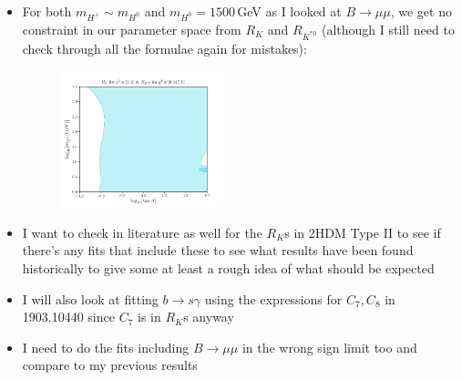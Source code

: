 \documentclass[11pt]{article}
\begin{document}
\begin{itemize}
    \item For both $m_{H^+}\sim m_{H^0}$ and $m_{H^0}=1500\,$GeV as I looked at $B\to\mu\mu$, we get no constraint in our parameter space from $R_K$ and $R_{K^{*0}}$ (although I still need to check through all the formulae again for mistakes):
        \begin{figure}[H]
            \centering
            \includegraphics[width=0.45\textwidth]{rks_plot.png}
        \end{figure}
    \item I want to check in literature as well for the $R_K$s in 2HDM Type II to see if there's any fits that include these to see what results have been found historically to give some at least a rough idea of what should be expected
    \item I will also look at fitting $b\to s\gamma$ using the expressions for $C_7,C_8$ in 1903.10440 since $C_7$ is in $R_K$s anyway
    \item I need to do the fits including $B\to\mu\mu$ in the wrong sign limit too and compare to my previous results
\end{itemize}
\end{document}

